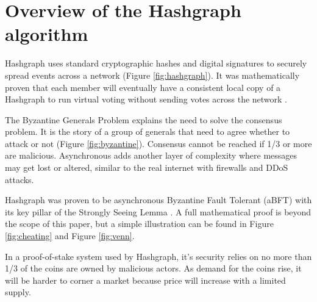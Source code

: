 \section{Overview of the Hashgraph algorithm}



Hashgraph uses standard cryptographic hashes and digital signatures to securely spread events across a network (Figure \ref{fig:hashgraph}). It was mathematically proven that each member will eventually have a consistent local copy of a Hashgraph to run virtual voting without sending votes across the network \cite{baird2016}.


The Byzantine Generals Problem \cite{shostak1982byzantine} explains the need to solve the consensus problem. It is the story of a group of generals that need to agree whether to attack or not (Figure \ref{fig:byzantine}). Consensus cannot be reached if 1/3 or more are malicious. Asynchronous adds another layer of complexity where messages may get lost or altered, similar to the real internet with firewalls and DDoS attacks.



Hashgraph was proven to be asynchronous Byzantine Fault Tolerant (aBFT) with its key pillar of the Strongly Seeing Lemma \cite{baird2016}. A full mathematical proof is beyond the scope of this paper, but a simple illustration can be found in Figure \ref{fig:cheating} and Figure \ref{fig:venn}.



In a proof-of-stake system used by Hashgraph, it's security relies on no more than 1/3 of the coins are owned by malicious actors. As demand for the coins rise, it will be harder to corner a market because price will increase with a limited supply.

